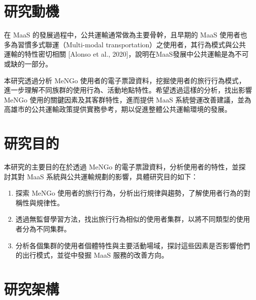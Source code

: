 \section{研究動機}\label{ux7814ux7a76ux52d5ux6a5f}

在 MaaS 的發展過程中，公共運輸通常做為主要骨幹，且早期的 MaaS
使用者也多為習慣多式聯運（Multi-modal
transportation）之使用者，其行為模式與公共運輸的特性密切相關 {[}Alonso
et al., 2020{]}，說明在MaaS發展中公共運輸是為不可或缺的一部分。

本研究透過分析 MeNGo
使用者的電子票證資料，挖掘使用者的旅行行為模式，進一步理解不同族群的使用行為、活動地點特性。希望透過這樣的分析，找出影響
MeNGo 使用的關鍵因素及其客群特性，進而提供 MaaS
系統營運改善建議，並為高雄市的公共運輸政策提供實務參考，期以促進整體公共運輸環境的發展。

\section{研究目的}\label{ux7814ux7a76ux76eeux7684}

本研究的主要目的在於透過 MeNGo
的電子票證資料，分析使用者的特性，並探討其對 MaaS
系統與公共運輸規劃的影響，具體研究目的如下：

\begin{enumerate}
\def\labelenumi{\arabic{enumi}.}
\tightlist
\item
  探索 MeNGo
  使用者的旅行行為，分析出行規律與趨勢，了解使用者行為的對稱性與規律性。
\item
  透過無監督學習方法，找出旅行行為相似的使用者集群，以將不同類型的使用者分為不同集群。
\item
  分析各個集群的使用者個體特性與主要活動場域，探討這些因素是否影響他們的出行模式，並從中發掘
  MaaS 服務的改善方向。
\end{enumerate}

\section{研究架構}\label{ux7814ux7a76ux67b6ux69cb}
